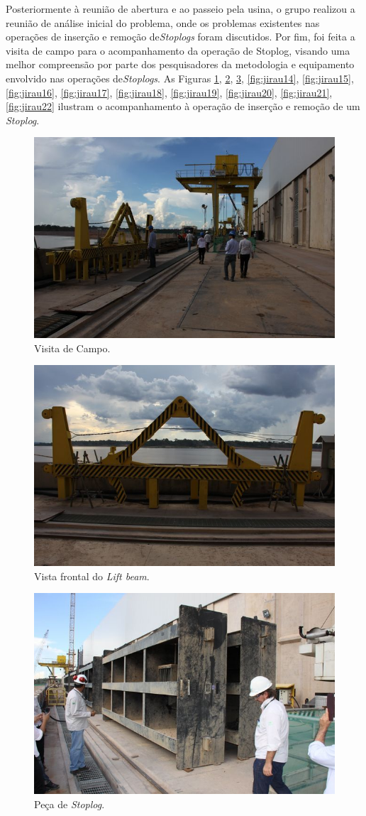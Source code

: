 \clearpage

Posteriormente à reunião de abertura e ao passeio pela usina, 
o grupo realizou a reunião de análise inicial do problema, onde os problemas
existentes nas operações de inserção e remoção de\emph{Stoplogs} foram
discutidos.
Por fim, foi feita a visita de campo para o acompanhamento da operação de
Stoplog, visando uma melhor compreensão por parte dos pesquisadores da
metodologia e equipamento envolvido nas operações de\emph{Stoplogs}. As Figuras
\ref{fig:jirau9}, \ref{fig:jirau11}, \ref{fig:jirau13}, \ref{fig:jirau14},
\ref{fig:jirau15}, \ref{fig:jirau16}, \ref{fig:jirau17}, \ref{fig:jirau18},
\ref{fig:jirau19}, \ref{fig:jirau20}, \ref{fig:jirau21}, \ref{fig:jirau22}
ilustram o acompanhamento à operação de inserção e remoção de um \emph{Stoplog}.

\begin{figure}[h!]
    \centering \includegraphics[width=0.6\columnwidth]{figs/jirau/jirau_09}
    \caption{Visita de Campo.}
    \label{fig:jirau9}
\end{figure}

\begin{figure}[h!]
    \centering \includegraphics[width=0.6\columnwidth]{figs/jirau/jirau_11}
    \caption{Vista frontal do \emph{Lift beam}.}
    \label{fig:jirau11}
\end{figure}

\begin{figure}[h!]
    \centering \includegraphics[width=0.6\columnwidth]{figs/jirau/jirau_13}
    \caption{Peça de \emph{Stoplog}.}
    \label{fig:jirau13}
\end{figure}

